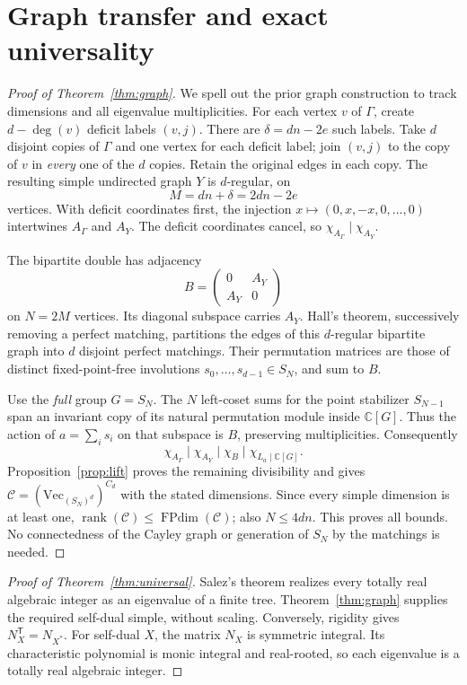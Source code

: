\documentclass[11pt]{amsart}
\theoremstyle{remark}
\newcommand{\VEC}{\mathrm{Vec}}
\newcommand{\FPdim}{\operatorname{FPdim}}
\newcommand{\rank}{\operatorname{rank}}
\newcommand{\C}{\mathbb C}
\newcommand{\ch}{\chi}
\begin{document}
\section{Graph transfer and exact universality}

\begin{proof}[Proof of Theorem~\ref{thm:graph}]
We spell out the prior graph construction \cite{Godsil} to track
dimensions and all eigenvalue multiplicities. For each vertex $v$ of
$\Gamma$, create $d-\deg(v)$ deficit labels $(v,j)$. There are
$\delta=dn-2e$ such labels. Take $d$ disjoint copies of $\Gamma$ and
one vertex for each deficit label; join $(v,j)$ to the copy of $v$
in \emph{every} one of the $d$ copies. Retain the original edges in
each copy. The resulting simple undirected graph $Y$ is $d$-regular,
on
\[
 M=dn+\delta=2dn-2e
\]
vertices. With deficit coordinates first, the injection
$x\mapsto(0,x,-x,0,\ldots,0)$ intertwines $A_\Gamma$ and $A_Y$.
The deficit coordinates cancel, so
$\ch_{A_\Gamma}\mid\ch_{A_Y}$.

The bipartite double has adjacency
\[
 B=\begin{pmatrix}0&A_Y\\ A_Y&0\end{pmatrix}
\]
on $N=2M$ vertices. Its diagonal subspace carries $A_Y$.
Hall's theorem, successively removing a perfect matching, partitions
the edges of this $d$-regular bipartite graph into $d$ disjoint perfect
matchings. Their permutation matrices are those of distinct
fixed-point-free involutions $s_0,\ldots,s_{d-1}\in S_N$, and sum to $B$.

Use the \emph{full} group $G=S_N$. The $N$ left-coset sums for the point
stabilizer $S_{N-1}$ span an invariant copy of its natural permutation
module inside $\C[G]$. Thus the action of $a=\sum_i s_i$ on that subspace
is $B$, preserving multiplicities. Consequently
\[
 \ch_{A_\Gamma}\mid\ch_{A_Y}\mid\ch_B\mid\ch_{L_a\mid\C[G]}.
\]
Proposition~\ref{prop:lift} proves the remaining divisibility and gives
$\mathcal C=(\VEC_{(S_N)^d})^{C_d}$ with the stated dimensions.
Since every simple dimension is at least one,
$\rank(\mathcal C)\le\FPdim(\mathcal C)$; also $N\le4dn$.
This proves all bounds. No connectedness of the Cayley graph or
generation of $S_N$ by the matchings is needed.
\end{proof}

\begin{proof}[Proof of Theorem~\ref{thm:universal}]
Salez's theorem \cite[Theorem 1]{Salez} realizes every totally real
algebraic integer as an eigenvalue of a finite tree.
Theorem~\ref{thm:graph} supplies the required self-dual simple, without
scaling. Conversely, rigidity gives $N_X^{\mathsf T}=N_{X^*}$.
For self-dual $X$, the matrix $N_X$ is symmetric integral.
Its characteristic polynomial is monic integral and real-rooted,
so each eigenvalue is a totally real algebraic integer.
\end{proof}
\end{document}
